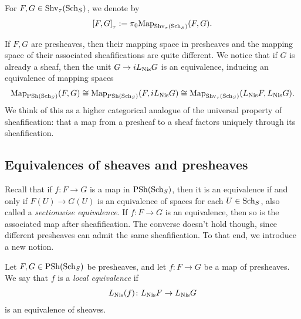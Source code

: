 \documentclass[11pt,openany]{book}
\renewcommand{\Pre}{\mathrm{PSh}}
\begin{document}
\begin{notation} For $F,G \in \mathrm{Shv}_\tau(\mathrm{Sch}_S)$, we denote by 
\begin{align*}
    \left[ F,G \right]_\tau := \pi_0 \mathrm{Map}_{\mathrm{Shv}_\tau(\mathrm{Sch}_S)}(F,G).
\end{align*}
\end{notation}

\begin{remark} If $F,G$ are presheaves, then their mapping space in presheaves and the mapping space of their associated sheafifications are quite different. We notice that if $G$ is already a sheaf, then the unit $G \to i L_{\mathrm{Nis}} G$ is an equivalence, inducing an equivalence of mapping spaces
\begin{align*}
    \Map_{\Pre(\Sch_S)}(F,G) \cong \Map_{\Pre(\Sch_S)}(F, i L_\Nis G) \cong \Map_{\Shv_\tau(\Sch_S)}(L_\Nis F, L_\Nis G).
\end{align*}
We think of this as a higher categorical analogue of the universal property of sheafification: that a map from a presheaf to a sheaf factors uniquely through its sheafification.
\end{remark}



\subsection{Equivalences of sheaves and presheaves}

Recall that if $f\colon F \to G$ is a map in $\Pre(\Sch_S)$, then it is an equivalence if and only if $F(U) \to G(U)$ is an equivalence of spaces for each $U \in \mathrm{Sch}_S$, also called a \textit{sectionwise equivalence}. If $f\colon F \to G$ is an equivalence, then so is the associated map after sheafification. The converse doesn't hold though, since different presheaves can admit the same sheafification. To that end, we introduce a new notion.

\begin{definition} Let $F,G\in \Pre(\Sch_S)$ be presheaves, and let $f \colon F \to G$ be a map of presheaves. We say that $f$ is a \textit{local equivalence} if
\begin{align*}
    L_{\mathrm{Nis}} (f) \colon L_{\mathrm{Nis}} F \to L_{\mathrm{Nis}} G
\end{align*}
is an equivalence of sheaves.
\end{definition}
\end{document}
